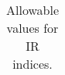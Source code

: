 \begin{table}[H]
\begin{tabular}{|l|l|}
\end{tabular}
  \caption{Allowable values for IR indices.}
  \label{tab:IR_indices}
\end{table}



